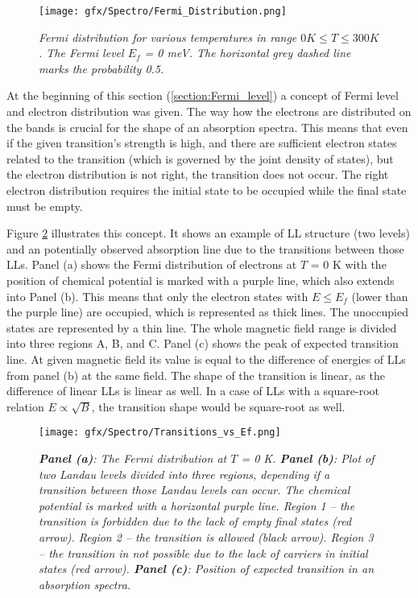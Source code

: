 \documentclass[titlepage,a4paper]{book}
\begin{document}
\begin{figure}[ht]
	\centering
	\texttt{[image: gfx/Spectro/Fermi\_Distribution.png]}
	\vspace{-10pt}
	\caption{\textit{Fermi distribution for various temperatures in range $0 K \leq T \leq 300 K$. The Fermi level $E_f$ = 0 meV. The horizontal grey dashed line marks the probability 0.5.}}
	\label{fig:Fermi_Distribution}
\end{figure}

At the beginning of this section (\ref{section:Fermi_level}) a concept of Fermi level and electron distribution was given. The way how the electrons are distributed on the bands is crucial for the shape of an absorption spectra. This means that even if the given transition's strength is high, and there are sufficient electron states related to the transition (which is governed by the joint density of states), but the electron distribution is not right, the transition does not occur. The right electron distribution requires the initial state to be occupied while the final state must be empty. 

Figure \ref{fig:Transitions_vs_Ef} illustrates this concept. It shows an example of LL structure (two levels) and an potentially observed absorption line due to the transitions between those LLs. Panel (a) shows the Fermi distribution of electrons at $T$ = 0 K with the position of chemical potential is marked with a purple line, which also extends into Panel (b). This means that only the electron states with $E \leq E_f$ (lower than the purple line) are occupied, which is represented as thick lines. The unoccupied states are represented by a thin line. The whole magnetic field range is divided into three regions A, B, and C. Panel (c) shows the peak of expected transition line. At given magnetic field its value is equal to the difference of energies of LLs from panel (b) at the same field. The shape of the transition is linear, as the difference of linear LLs is linear as well. In a case of LLs with a square-root relation $E \propto \sqrt{B}$, the transition shape would be square-root as well. 

\begin{figure}[ht]
	\centering
	\texttt{[image: gfx/Spectro/Transitions\_vs\_Ef.png]}
	\vspace{-10pt}
	\caption{\textit{\textbf{Panel (a)}: The Fermi distribution at $T$ = 0 K. \textbf{Panel (b)}: Plot of two Landau levels divided into three regions, depending if a transition between those Landau levels can occur. The chemical potential is marked with a horizontal purple line. Region 1 -- the transition is forbidden due to the lack of empty final states (red arrow). Region 2 -- the transition is allowed (black arrow). Region 3 -- the transition in not possible due to the lack of carriers in initial states (red arrow). \textbf{Panel (c)}: Position of expected transition in an absorption spectra.}}
	\label{fig:Transitions_vs_Ef}
\end{figure}
\end{document}
